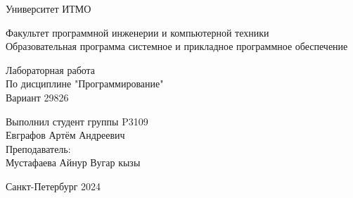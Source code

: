 

\thispagestyle{empty}
\begin{center}
\LARGE{Университет ИТМО} 
\vspace{20pt}

\LARGE{Факультет программной инженерии и компьютерной техники \\
Образовательная программа системное и прикладное программное обеспечение}
\vspace{160pt}

\LARGE{Лабораторная работа   \\
По дисциплине "Программирование" \\ 
Вариант 29826}
\vspace{120pt}
\end{center}

\begin{flushright}
\LARGE{Выполнил студент группы P3109 \\ 
Евграфов Артём Андреевич \\
Преподаватель: \\
Мустафаева Айнур Вугар кызы}
\vspace{120pt}
\end{flushright}

\begin{center}
\Large{Санкт-Петербург 2024}
\end{center}

\newpage
\setcounter{page}{1}
\tableofcontents
\newpage
